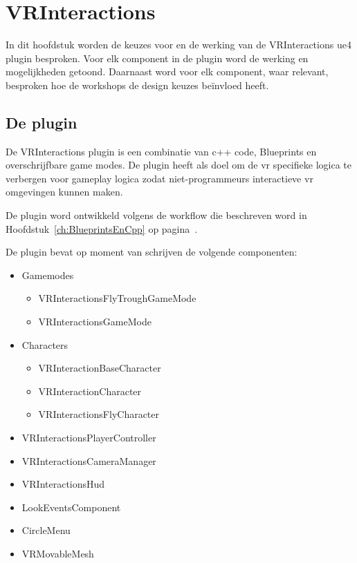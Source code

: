 \lstset {language=C++}

\chapter{VRInteractions}
In dit hoofdstuk worden de keuzes voor en de werking van de VRInteractions \gls{ue4} plugin besproken. 
Voor elk component in de plugin word de werking en mogelijkheden getoond. Daarnaast word voor elk component, waar relevant, besproken hoe de workshops de design keuzes beïnvloed heeft.

\section{De plugin}
De VRInteractions plugin is een combinatie van c++ code, Blueprints en overschrijfbare game modes.
De plugin heeft als doel om de \gls{vr} specifieke logica te verbergen voor gameplay logica zodat niet-programmeurs interactieve \gls{vr} omgevingen kunnen maken.

De plugin word ontwikkeld volgens de workflow die beschreven word in Hoofdstuk~\ref{ch:BlueprintsEnCpp} op pagina~\pageref{ch:BlueprintsEnCpp}.

De plugin bevat op moment van schrijven de volgende componenten:
\begin{itemize}
	\item Gamemodes
		\begin{itemize}
			\item VRInteractionsFlyTroughGameMode
			\item VRInteractionsGameMode
		\end{itemize}
	\item Characters
		\begin{itemize}
			\item VRInteractionBaseCharacter
			\item VRInteractionCharacter
			\item VRInteractionsFlyCharacter
		\end{itemize}
	\item VRInteractionsPlayerController
	\item VRInteractionsCameraManager
	\item VRInteractionsHud
	\item LookEventsComponent
	\item CircleMenu
	\item VRMovableMesh
\end{itemize}

